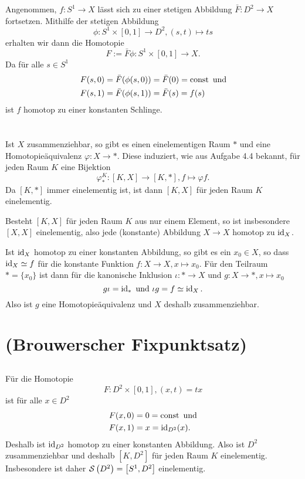 \documentclass[a4paper,10pt]{article}
\begin{document}
Angenommen, $f: S^1 \to X$ lässt sich zu einer stetigen Abbildung $\bar{F} : D^2 \to X$ fortsetzen. Mithilfe der stetigen Abbildung
\[
 \phi: S^1 \times [0,1] \to D^2, (s,t) \mapsto ts
\]
erhalten wir dann die Homotopie
\[
 F := \bar{F} \phi : S^1 \times [0,1] \to X.
\]
Da für alle $s \in S^1$
\begin{align*}
 F(s,0) &= \bar{F}(\phi(s,0)) = \bar{F}(0) = \operatorname{const} \text{ und} \\
 F(s,1) &= \bar{F}(\phi(s,1)) = \bar{F}(s) = f(s)
\end{align*}
ist $f$ homotop zu einer konstanten Schlinge.





\section{}
Ist $X$ zusammenziehbar, so gibt es einen einelementigen Raum $\ast$ und eine Homotopieäquivalenz $\varphi : X \to \ast$. Diese induziert, wie aus Aufgabe 4.4 bekannt, für jeden Raum $K$ eine Bijektion
\[
 \varphi^K_* :  [K,X] \to [K,\ast], f \mapsto \varphi f.
\]
Da $[K, \ast]$ immer einelementig ist, ist dann $[K,X]$ für jeden Raum $K$ einelementig.

Besteht $[K,X]$ für jeden Raum $K$ aus nur einem Element, so ist insbesondere $[X,X]$ einelementig, also jede (konstante) Abbildung $X \to X$ homotop zu $\operatorname{id}_X$.

Ist $\operatorname{id}_X$ homotop zu einer konstanten Abbildung, so gibt es ein $x_0 \in X$, so dass $\operatorname{id}_X \simeq f$ für die konstante Funktion $f : X \to X, x \mapsto x_0$. Für den Teilraum $\ast = \{x_0\}$ ist dann für die kanonische Inklusion $\iota : \ast \to X$ und $g : X \to \ast, x \mapsto x_0$
\[
 g \iota = \operatorname{id}_{\ast} \text{ und } \iota g = f \simeq \operatorname{id}_X.
\]
Also ist $g$ eine Homotopieäquivalenz und $X$ deshalb zusammenziehbar.






\section{(Brouwerscher Fixpunktsatz)}


\subsection{}
Für die Homotopie
\[
 F: D^2 \times [0,1], (x,t) = tx
\]
ist für alle $x \in D^2$
\begin{align*}
 F(x,0) &= 0 = \operatorname{const} \text{ und}\\
 F(x,1) &= x = \operatorname{id}_{D^2}(x).
\end{align*}
Deshalb ist $\operatorname{id}_{D^2}$ homotop zu einer konstanten Abbildung. Also ist $D^2$ zusammenziehbar und deshalb $\left[ K,D^2 \right]$ für jeden Raum $K$ einelementig. Insbesondere ist daher $\mathcal{S}\left(D^2\right) = \left[ S^1, D^2 \right]$ einelementig.
\end{document}
